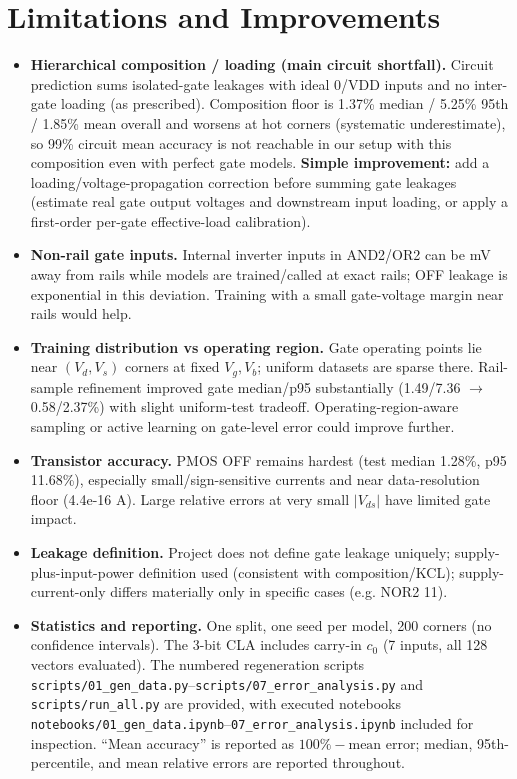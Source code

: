 \documentclass[11pt,a4paper]{article}
\begin{document}
\section{Limitations and Improvements}
\begin{itemize}[leftmargin=*]
\item \textbf{Hierarchical composition / loading (main circuit shortfall).} Circuit prediction sums isolated-gate leakages with ideal 0/VDD inputs and no inter-gate loading (as prescribed). Composition floor is 1.37\% median / 5.25\% 95th / 1.85\% mean overall and worsens at hot corners (systematic underestimate), so 99\% circuit mean accuracy is not reachable in our setup with this composition even with perfect gate models. \textbf{Simple improvement:} add a loading/voltage-propagation correction before summing gate leakages (estimate real gate output voltages and downstream input loading, or apply a first-order per-gate effective-load calibration).
\item \textbf{Non-rail gate inputs.} Internal inverter inputs in AND2/OR2 can be mV away from rails while models are trained/called at exact rails; OFF leakage is exponential in this deviation. Training with a small gate-voltage margin near rails would help.
\item \textbf{Training distribution vs operating region.} Gate operating points lie near $(V_d,V_s)$ corners at fixed $V_g,V_b$; uniform datasets are sparse there. Rail-sample refinement improved gate median/p95 substantially (1.49/7.36 $\to$ 0.58/2.37\%) with slight uniform-test tradeoff. Operating-region-aware sampling or active learning on gate-level error could improve further.
\item \textbf{Transistor accuracy.} PMOS OFF remains hardest (test median 1.28\%, p95 11.68\%), especially small/sign-sensitive currents and near data-resolution floor (4.4e-16 A). Large relative errors at very small $|V_{ds}|$ have limited gate impact.
\item \textbf{Leakage definition.} Project does not define gate leakage uniquely; supply-plus-input-power definition used (consistent with composition/KCL); supply-current-only differs materially only in specific cases (e.g. NOR2 11).
\item \textbf{Statistics and reporting.} One split, one seed per model, 200 corners (no confidence intervals). The 3-bit CLA includes carry-in $c_0$ (7 inputs, all 128 vectors evaluated). The numbered regeneration scripts \texttt{scripts/01\_gen\_data.py}--\texttt{scripts/07\_error\_analysis.py} and \texttt{scripts/run\_all.py} are provided, with executed notebooks \texttt{notebooks/01\_gen\_data.ipynb}--\texttt{07\_error\_analysis.ipynb} included for inspection. ``Mean accuracy'' is reported as $100\%-\text{mean error}$; median, 95th-percentile, and mean relative errors are reported throughout.
\end{itemize}
\end{document}
